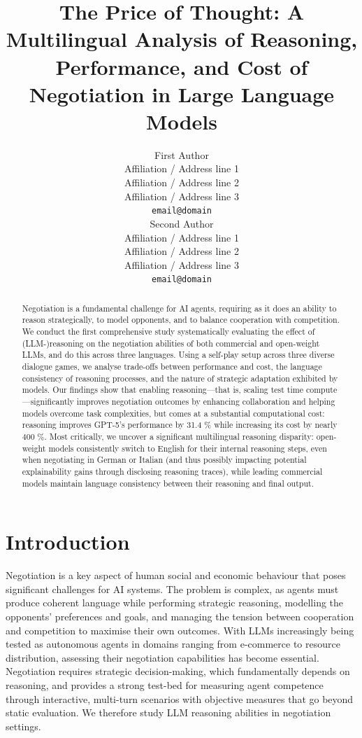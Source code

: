 \documentclass[11pt]{article}
\title{The Price of Thought: A Multilingual Analysis of Reasoning, Performance, and Cost of Negotiation in Large Language Models}
\author{First Author \\
  Affiliation / Address line 1 \\
  Affiliation / Address line 2 \\
  Affiliation / Address line 3 \\
  \texttt{email@domain} \\\And
  Second Author \\
  Affiliation / Address line 1 \\
  Affiliation / Address line 2 \\
  Affiliation / Address line 3 \\
  \texttt{email@domain} \\}
\begin{document}
\maketitle
\begin{abstract}
Negotiation is a fundamental challenge for AI agents, requiring as it does an ability to reason strategically, to model opponents, and to balance cooperation with competition. We conduct the first comprehensive study systematically evaluating the effect of (LLM-)reasoning on the negotiation abilities of both commercial and open-weight LLMs, and do this across three languages. Using a self-play setup across three diverse dialogue games, we analyse trade-offs between performance and cost, the language consistency of reasoning processes, and the nature of strategic adaptation exhibited by models.
Our findings show that enabling reasoning---that is, scaling test time compute---significantly improves negotiation outcomes by enhancing collaboration and helping models overcome task complexities, but comes at a substantial computational cost: reasoning improves GPT-5's performance by 31.4 \% while increasing its cost by nearly 400 \%. Most critically, we uncover a significant multilingual reasoning disparity: open-weight models consistently switch to English for their internal reasoning steps, even when negotiating in German or Italian (and thus possibly impacting potential explainability gains through disclosing reasoning traces), while leading commercial models maintain language consistency between their reasoning and final output.
\end{abstract}

\section{Introduction}

Negotiation is a key aspect of human social and economic behaviour that poses significant challenges for AI systems. The problem is complex, as agents must produce coherent language while performing strategic reasoning, modelling the opponents' preferences and goals, and managing the tension between cooperation and competition to maximise their own outcomes. 
With LLMs increasingly being tested as autonomous agents in domains ranging from e-commerce to resource distribution, assessing their negotiation capabilities has become essential. Negotiation requires strategic decision-making, which fundamentally depends on reasoning, and provides a strong test-bed for measuring agent competence through interactive, multi-turn scenarios with objective measures that go beyond static evaluation. We therefore study LLM reasoning abilities in negotiation settings.
\end{document}
